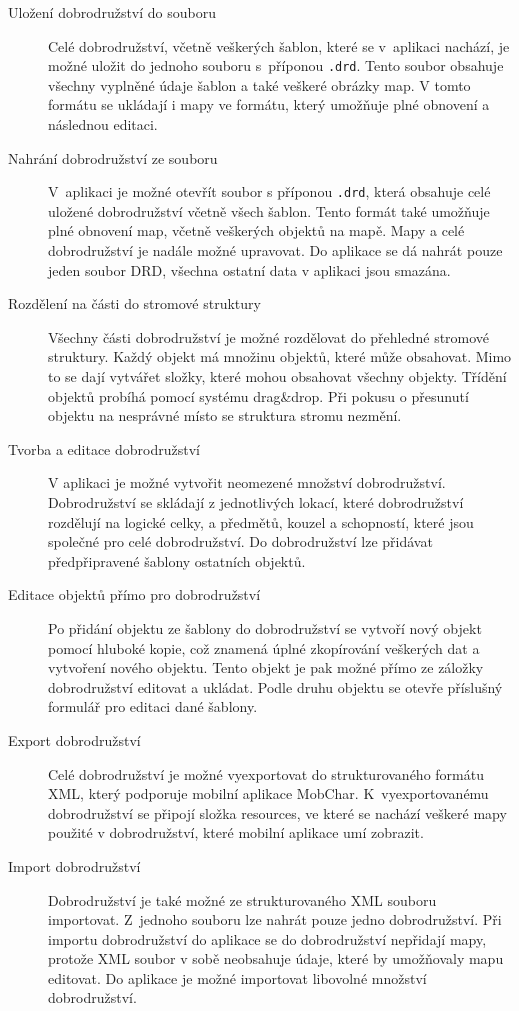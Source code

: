 \documentclass[thesis=B,czech]{resources/FITthesis}[2012/06/26]
\begin{document}
	\begin{description}
		\item[Uložení dobrodružství do souboru]
Celé dobrodružství, včetně veškerých šablon, které se v~aplikaci nachází, je možné uložit do jednoho souboru s~příponou \texttt{.drd}. Tento soubor obsahuje všechny vyplněné údaje šablon a také veškeré obrázky map. V tomto formátu se ukládají i mapy ve formátu, který umožňuje plné obnovení a následnou editaci. 

		\item[Nahrání dobrodružství ze souboru]
V~aplikaci je možné otevřít soubor s příponou \texttt{.drd}, která obsahuje celé uložené dobrodružství včetně všech šablon. Tento formát také umožňuje plné obnovení map, včetně veškerých objektů na mapě. Mapy a celé dobrodružství je nadále možné upravovat. Do aplikace se dá nahrát pouze jeden soubor DRD, všechna ostatní data v aplikaci jsou smazána.
 
		\item[Rozdělení na části do stromové struktury]
		Všechny části dobrodružství je možné rozdělovat do přehledné stromové struktury. Každý objekt má množinu objektů, které může obsahovat. Mimo to se dají vytvářet složky, které mohou obsahovat všechny objekty. Třídění objektů probíhá pomocí systému drag\&drop. Při pokusu o přesunutí objektu na nesprávné místo se struktura stromu nezmění. 
		
		\item[Tvorba a editace dobrodružství]
V aplikaci je možné vytvořit neomezené množství dobrodružství. Dobrodružství se skládají z jednotlivých lokací, které dobrodružství rozdělují na logické celky, a předmětů, kouzel a schopností, které jsou společné pro celé dobrodružství. Do dobrodružství lze přidávat předpřipravené šablony ostatních objektů. 

		\item[Editace objektů přímo pro dobrodružství]
Po přidání objektu ze šablony do dobrodružství se vytvoří nový objekt pomocí hluboké kopie, což znamená úplné zkopírování veškerých dat a vytvoření nového objektu. Tento objekt je pak možné přímo ze záložky dobrodružství editovat a ukládat. Podle druhu objektu se otevře příslušný formulář pro editaci dané šablony.

		\item[Export dobrodružství]
		Celé dobrodružství je možné vyexportovat do strukturovaného formátu XML, který podporuje mobilní aplikace MobChar. K~vyexportovanému dobrodružství se připojí složka resources, ve které se nachází veškeré mapy použité v dobrodružství, které mobilní aplikace umí zobrazit. 
		
		\item[Import dobrodružství]
		Dobrodružství je také možné ze strukturovaného XML souboru importovat. Z~jednoho souboru lze nahrát pouze jedno dobrodružství. Při importu dobrodružství do aplikace se do dobrodružství nepřidají mapy, protože XML soubor v sobě neobsahuje údaje, které by umožňovaly mapu editovat. Do aplikace je možné importovat libovolné množství dobrodružství.
	\end{description}
	
\end{document}
